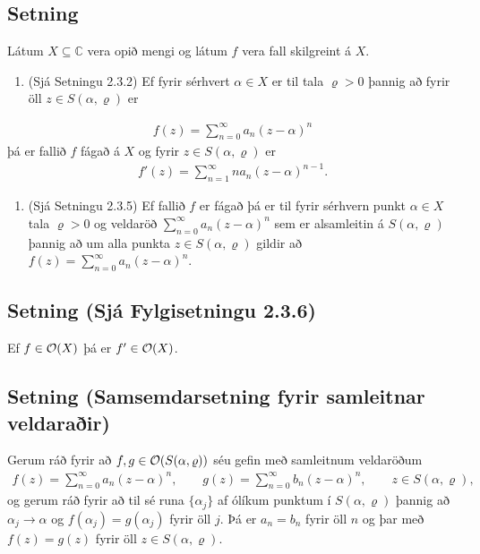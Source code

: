 \documentclass[a4paper,10pt,icelandic]{sphinxmanual}
\begin{document}
\subsection{Setning}
\label{\detokenize{Kafli02:id4}}
Látum \(X\subseteq {\mathbb{C}}\) vera opið mengi og látum
\(f\) vera fall skilgreint á \(X\).
\begin{enumerate}
%
\item {} 
(Sjá Setningu 2.3.2) Ef fyrir sérhvert \(\alpha\in X\) er til tala \(\varrho>0\) þannig að fyrir öll \(z\in S(\alpha, \varrho)\) er

\end{enumerate}
\begin{equation*}
\begin{split}f(z)= \sum_{n=0}^\infty a_n(z-\alpha)^n\end{split}
\end{equation*}
þá er fallið \(f\) fágað á \(X\) og fyrir \(z\in S(\alpha, \varrho)\) er
\begin{equation*}
\begin{split}f'(z)= \sum_{n=1}^\infty na_n(z-\alpha)^{n-1}.\end{split}
\end{equation*}\begin{enumerate}
%
\setcounter{enumi}{1}
\item {} 
(Sjá Setningu 2.3.5) Ef fallið \(f\) er fágað þá er til fyrir sérhvern punkt \(\alpha\in X\) tala \(\varrho>0\) og veldaröð \(\sum_{n=0}^\infty a_n(z-\alpha)^n\) sem er alsamleitin á \(S(\alpha, \varrho)\) þannig að um alla punkta \(z\in S(\alpha, \varrho)\) gildir að \(f(z)=\sum_{n=0}^\infty a_n(z-\alpha)^n\).

\end{enumerate}


\subsection{Setning (Sjá Fylgisetningu 2.3.6)}
\label{\detokenize{Kafli02:setning-sja-fylgisetningu-2-3-6}}
Ef \(f\in {\cal O}(X)\) þá er \(f'\in {\cal O}(X)\).


\subsection{Setning (Samsemdarsetning fyrir samleitnar veldaraðir)}
\label{\detokenize{Kafli02:setning-samsemdarsetning-fyrir-samleitnar-veldarair}}
Gerum ráð fyrir að \(f,g\in {\cal O}(S(\alpha,\varrho))\) séu gefin með samleitnum veldaröðum
\begin{equation*}
\begin{split}f(z)=\sum\limits_{n=0}^\infty a_n(z-\alpha)^n, \qquad
g(z)=\sum\limits_{n=0}^\infty b_n(z-\alpha)^n, \qquad
z\in S(\alpha,\varrho),\end{split}
\end{equation*}
og gerum ráð fyrir að til sé runa \(\{\alpha_j\}\) af ólíkum punktum í \(S(\alpha,\varrho)\) þannig að \(\alpha_j\to \alpha\) og \(f(\alpha_j)=g(\alpha_j)\) fyrir öll \(j\). Þá er \(a_n=b_n\) fyrir öll \(n\) og þar með \(f(z)=g(z)\) fyrir öll \(z\in S(\alpha,\varrho)\).
\end{document}
